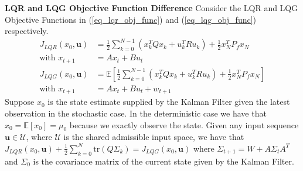 \begin{thrm}
\textbf{LQR and LQG Objective Function Difference} Consider the LQR and LQG Objective Functions in (\ref{eq_lqr_obj_func}) and (\ref{eq_lqg_obj_func}) respectively. 
\begin{align}
J_{LQR}(x_0, \mathbf{u}) &= \frac{1}{2}\sum_{k=0}^{N-1} \left( x_k^TQx_k + u_k^TRu_k \right) + \frac{1}{2}x_N^TP_fx_N \label{eq_lqr_obj_func}\\
\text{with } x_{t+1} &= Ax_t +Bu_t \nonumber\\
J_{LQG}(x_0, \mathbf{u}) &=  \mathbb{E}\left[ \frac{1}{2}\sum_{k=0}^{N-1} \left( x_k^TQx_k + u_k^TRu_k \right) + \frac{1}{2}x_N^TP_fx_N \right] \label{eq_lqg_obj_func} \\
\text{with } x_{t+1} &= Ax_t +Bu_t + w_{t+1} \nonumber
\end{align}
Suppose $x_0$ is the state estimate supplied by the Kalman Filter given the latest observation in the stochastic case. In the deterministic case we have that $x_0 = \mathbb{E}[x_0] = \mu_0$ because we exactly observe the state. Given any input sequence $\mathbf{u} \in \mathcal{U}$, where $\mathcal{U}$ is the shared admissible input space, we have that $J_{LQR}(x_0, \mathbf{u}) + \frac{1}{2}\sum_{k=0}^N \text{tr}(Q\Sigma_k) = J_{LQG}(x_0, \mathbf{u})$ where $ \Sigma_{t+1} = W+A\Sigma_t A^T$ and $\Sigma_0$ is the covariance matrix of the current state given by the Kalman Filter.
\label{thrm_lqr_lqg_diff}
\end{thrm}
